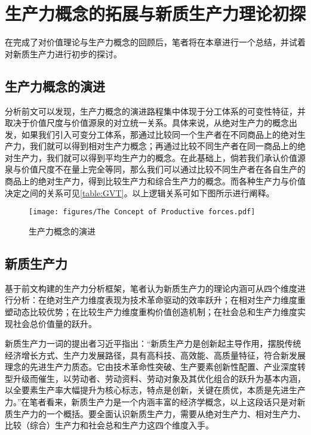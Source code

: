 
\chapter{生产力概念的拓展与新质生产力理论初探}

在完成了对价值理论与生产力概念的回顾后，笔者将在本章进行一个总结，并试着对新质生产力进行初步的探讨。

\section{生产力概念的演进}

分析前文可以发现，生产力概念的演进路程集中体现于分工体系的可变性特征，并取决于价值尺度与价值源泉的对立统一关系。具体来说，从绝对生产力的概念出发，如果我们引入可变分工体系，那通过比较同一个生产者在不同商品上的绝对生产力，我们就可以得到相对生产力概念；再通过比较不同生产者在同一商品上的绝对生产力，我们就可以得到平均生产力的概念。在此基础上，倘若我们承认价值源泉与价值尺度不在量上完全等同，那么我们可以通过比较不同生产者在各自生产的商品上的绝对生产力，得到比较生产力和综合生产力的概念。而各种生产力与价值决定之间的关系可见\ref{table:GVT}。以上逻辑关系可如下图所示进行阐释。

\begin{figure}[!h]
    \centering
    \texttt{[image: figures/The Concept of Productive forces.pdf]}
    \caption{生产力概念的演进}
\end{figure}

\section{新质生产力}

基于前文构建的生产力分析框架，笔者认为新质生产力的理论内涵可从四个维度进行分析：在绝对生产力维度表现为技术革命驱动的效率跃升；在相对生产力维度重塑动态比较优势；在比较生产力维度重构价值创造机制；在社会总和生产力维度实现社会总价值量的跃升。

新质生产力一词的提出者习近平指出：“新质生产力是创新起主导作用，摆脱传统经济增长方式、生产力发展路径，具有高科技、高效能、高质量特征，符合新发展理念的先进生产力质态。它由技术革命性突破、生产要素创新性配置、产业深度转型升级而催生，以劳动者、劳动资料、劳动对象及其优化组合的跃升为基本内涵，以全要素生产率大幅提升为核心标志，特点是创新，关键在质优，本质是先进生产力。”\cite[515-516]{XiJinPingXiJinPingJingJiWenXuanDiYiJuan2025}在笔者看来，新质生产力是一个内涵丰富的经济学概念，以上这段话只是对新质生产力的一个概括。要全面认识新质生产力，需要从绝对生产力、相对生产力、比较（综合）生产力和社会总和生产力这四个维度入手。

